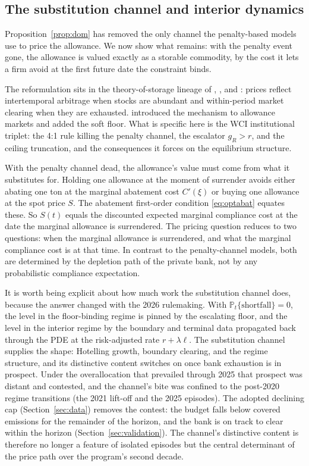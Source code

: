 \documentclass[11pt,letterpaper]{article}
\theoremstyle{plain}
\theoremstyle{definition}
\newcommand{\Prob}{\mathbb{P}}               %
\numberwithin{equation}{section}
\begin{document}
\subsection{The substitution channel and interior dynamics}\label{sec:interior}

Proposition~\ref{prop:dom} has removed the only channel the penalty-based models use to price the allowance. We now show what remains: with the penalty event gone, the allowance is valued exactly as a storable commodity, by the cost it lets a firm avoid at the first future date the constraint binds.

The reformulation sits in the theory-of-storage lineage of \citet{working1933,working1949}, \citet{brennan1958}, and \citet{deaton1992,deaton1996}: prices reflect intertemporal arbitrage when stocks are abundant and within-period market clearing when they are exhausted. \citet{schennach2000} introduced the mechanism to allowance markets and \citet{salant2022} added the soft floor. What is specific here is the WCI institutional triplet: the 4:1 rule killing the penalty channel, the escalator $g_R>r$, and the ceiling truncation, and the consequences it forces on the equilibrium structure.

With the penalty channel dead, the allowance's value must come from what it substitutes for. Holding one allowance at the moment of surrender avoids either abating one ton at the marginal abatement cost $C'(\xi)$ or buying one allowance at the spot price $S$. The abatement first-order condition \eqref{eq:optabat} equates these. So $S(t)$ equals the discounted expected marginal compliance cost at the date the marginal allowance is surrendered. The pricing question reduces to two questions: when the marginal allowance is surrendered, and what the marginal compliance cost is at that time. In contrast to the penalty-channel models, both are determined by the depletion path of the private bank, not by any probabilistic compliance expectation.

It is worth being explicit about how much work the substitution channel does, because the answer changed with the 2026 rulemaking. With $\Prob_t\{\text{shortfall}\}=0$, the level in the floor-binding regime is pinned by the escalating floor, and the level in the interior regime by the boundary and terminal data propagated back through the PDE at the risk-adjusted rate $r+\lambda\ell$. The substitution channel supplies the shape: Hotelling growth, boundary clearing, and the regime structure, and its distinctive content switches on once bank exhaustion is in prospect. Under the overallocation that prevailed through 2025 that prospect was distant and contested, and the channel's bite was confined to the post-2020 regime transitions (the 2021 lift-off and the 2025 episodes). The adopted declining cap (Section~\ref{sec:data}) removes the contest: the budget falls below covered emissions for the remainder of the horizon, and the bank is on track to clear within the horizon (Section~\ref{sec:validation}). The channel's distinctive content is therefore no longer a feature of isolated episodes but the central determinant of the price path over the program's second decade.
\end{document}
